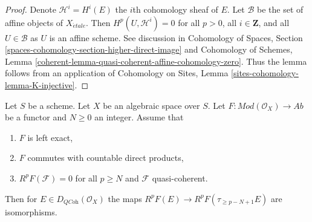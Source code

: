 \begin{proof}
Denote $\mathcal{H}^i = H^i(E)$ the $i$th cohomology sheaf of $E$.
Let $\mathcal{B}$ be the set of affine objects of $X_{\acute{e}tale}$.
Then $H^p(U, \mathcal{H}^i) = 0$ for all $p > 0$, all $i \in \mathbf{Z}$,
and all $U \in \mathcal{B}$ as $U$ is an affine scheme.
See discussion in
Cohomology of Spaces, Section
\ref{spaces-cohomology-section-higher-direct-image}
and
Cohomology of Schemes, Lemma
\ref{coherent-lemma-quasi-coherent-affine-cohomology-zero}.
Thus the lemma follows from an application of
Cohomology on Sites, Lemma \ref{sites-cohomology-lemma-K-injective}.
\end{proof}

\begin{lemma}
\label{lemma-application-nice-K-injective}
Let $S$ be a scheme. Let $X$ be an algebraic space over $S$.
Let $F : \textit{Mod}(\mathcal{O}_X) \to \textit{Ab}$
be a functor and $N \geq 0$ an integer. Assume that
\begin{enumerate}
\item $F$ is left exact,
\item $F$ commutes with countable direct products,
\item $R^pF(\mathcal{F}) = 0$ for all $p \geq N$ and $\mathcal{F}$
quasi-coherent.
\end{enumerate}
Then for $E \in D_{\textit{QCoh}}(\mathcal{O}_X)$ the maps
$R^pF(E) \to R^pF(\tau_{\geq p - N + 1}E)$ are isomorphisms.
\end{lemma}

